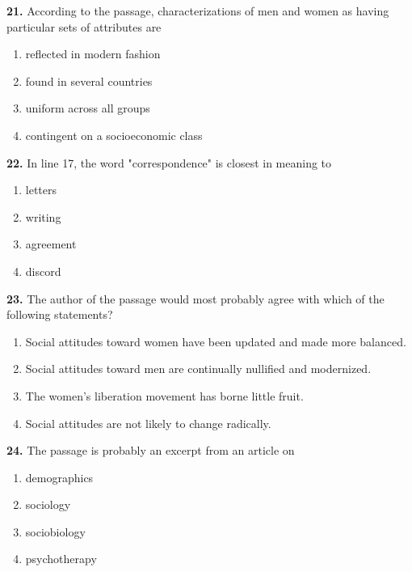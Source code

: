 \documentclass[12pt]{article}
\begin{document}
\noindent\textbf{21.} According to the passage, characterizations of men and women as having particular sets of attributes are
\begin{enumerate}[label=(\Alph*),leftmargin=*,itemsep=0.2em]
\item reflected in modern fashion
\item found in several countries
\item uniform across all groups
\item contingent on a socioeconomic class
\end{enumerate}
\par
\vspace{0.25\baselineskip}
\noindent\textbf{22.} In line 17, the word "correspondence" is closest in meaning to
\begin{enumerate}[label=(\Alph*),leftmargin=*,itemsep=0.2em]
\item letters
\item writing
\item agreement
\item discord
\end{enumerate}
\par
\vspace{0.25\baselineskip}
\noindent\textbf{23.} The author of the passage would most probably agree with which of the following statements?
\begin{enumerate}[label=(\Alph*),leftmargin=*,itemsep=0.2em]
\item Social attitudes toward women have been updated and made more balanced.
\item Social attitudes toward men are continually nullified and modernized.
\item The women's liberation movement has borne little fruit.
\item Social attitudes are not likely to change radically.
\end{enumerate}
\par
\vspace{0.25\baselineskip}
\noindent\textbf{24.} The passage is probably an excerpt from an article on
\begin{enumerate}[label=(\Alph*),leftmargin=*,itemsep=0.2em]
\item demographics
\item sociology
\item sociobiology
\item psychotherapy
\end{enumerate}
\par
\vspace{0.25\baselineskip}
\end{document}
